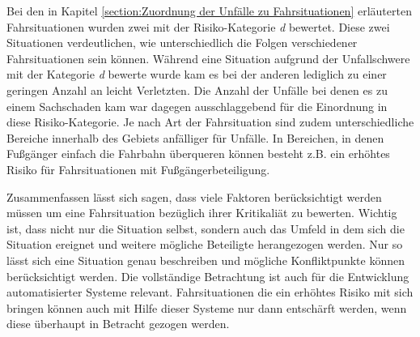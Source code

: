 Bei den in Kapitel \ref{section:Zuordnung der Unfälle zu Fahrsituationen} erläuterten Fahrsituationen wurden zwei mit der Risiko-Kategorie \textit{d} bewertet. Diese zwei Situationen verdeutlichen, wie unterschiedlich die Folgen verschiedener Fahrsituationen sein können. Während eine Situation aufgrund der Unfallschwere mit der Kategorie \textit{d} bewerte wurde kam es bei der anderen lediglich zu einer geringen Anzahl an leicht Verletzten. Die Anzahl der Unfälle bei denen es zu einem Sachschaden kam war dagegen ausschlaggebend für die Einordnung in diese Risiko-Kategorie. Je nach Art der Fahrsituation sind zudem unterschiedliche Bereiche innerhalb des Gebiets anfälliger für Unfälle. In Bereichen, in denen Fußgänger einfach die Fahrbahn überqueren können besteht z.B. ein erhöhtes Risiko für Fahrsituationen mit Fußgängerbeteiligung.

Zusammenfassen lässt sich sagen, dass viele Faktoren berücksichtigt werden müssen um eine Fahrsituation bezüglich ihrer Kritikaliät zu bewerten. Wichtig ist, dass nicht nur die Situation selbst, sondern auch das Umfeld in dem sich die Situation ereignet und weitere mögliche Beteiligte herangezogen werden. Nur so lässt sich eine Situation genau beschreiben und mögliche Konfliktpunkte können berücksichtigt werden. Die vollständige Betrachtung ist auch für die Entwicklung automatisierter Systeme relevant. Fahrsituationen die ein erhöhtes Risiko mit sich bringen können auch mit Hilfe dieser Systeme nur dann entschärft werden, wenn diese überhaupt in Betracht gezogen werden.